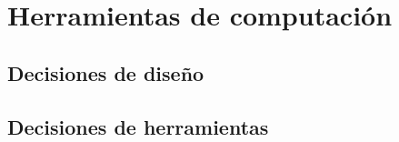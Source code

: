 \chapter{Herramientas de computación}
\section{Decisiones de diseño}
\section{Decisiones de herramientas}


